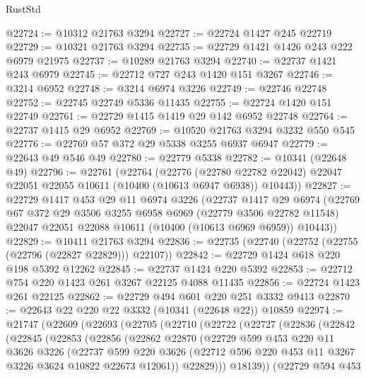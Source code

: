 \begin{lexlean}{RustStd}
\begin{coremodule}
@22724 := @10312 @21763 @3294
@22727 := @22724 @1427 @245 @22719
@22729 := @10321 @21763 @3294
@22735 := @22729 @1421 @1426 @243 @222 @6979 @21975
@22737 := @10289 @21763 @3294
@22740 := @22737 @1421 @243 @6979
@22745 := @22712 @727 @243 @1420 @151 @3267
@22746 := @3214 @6952
@22748 := @3214 @6974 @3226
@22749 := @22746 @22748
@22752 := @22745 @22749 @5336 @11435
@22755 := @22724 @1420 @151 @22749
@22761 := @22729 @1415 @1419 @29 @142 @6952 @22748
@22764 := @22737 @1415 @29 @6952
@22769 := @10520 @21763 @3294 @3232 @550 @545
@22776 := @22769 @57 @372 @29 @5338 @3255 @6937 @6947
@22779 := @22643 @49 @546 @49
@22780 := @22779 @5338
@22782 := @10341 (@22648 @49)
@22796 := @22761
    (@22764
      (@22776
        (@22780 @22782 @22042)
        @22047
        @22051
        @22055
        @10611
        (@10400 (@10613 @6947 @6938))
        @10443))
@22827 := @22729
    @1417
    @453
    @29
    @11
    @6974
    @3226
    (@22737
      @1417
      @29
      @6974
      (@22769
        @67
        @372
        @29
        @3506
        @3255
        @6958
        @6969
        (@22779 @3506 @22782 @11548)
        @22047
        @22051
        @22088
        @10611
        (@10400 (@10613 @6969 @6959))
        @10443))
@22829 := @10411 @21763 @3294
@22836 := @22735 (@22740 (@22752 (@22755 (@22796 (@22827 @22829))) @22107))
@22842 := @22729 @1424 @618 @220 @198 @5392 @12262
@22845 := @22737 @1424 @220 @5392
@22853 := @22712 @754 @220 @1423 @261 @3267 @22125 @4088 @11435
@22856 := @22724 @1423 @261 @22125
@22862 := @22729 @494 @601 @220 @251 @3332 @9413
@22870 := @22643 @22 @220 @22 @3332 (@10341 (@22648 @22)) @10859
@22974 := @21747
    (@22609
      (@22693
        (@22705
          (@22710
            (@22722
              (@22727
                (@22836
                  (@22842
                    (@22845
                      (@22853
                        (@22856
                          (@22862
                            @22870
                            (@22729
                              @599
                              @453
                              @220
                              @11
                              @3626
                              @3226
                              (@22737
                                @599
                                @220
                                @3626
                                (@22712 @596 @220 @453 @11 @3267 @3226 @3624 @10822 @22673 @12061))
                              @22829)))
                        @18139))
                    (@22729
                      @594
                      @453

\end{coremodule}
\end{lexlean}
